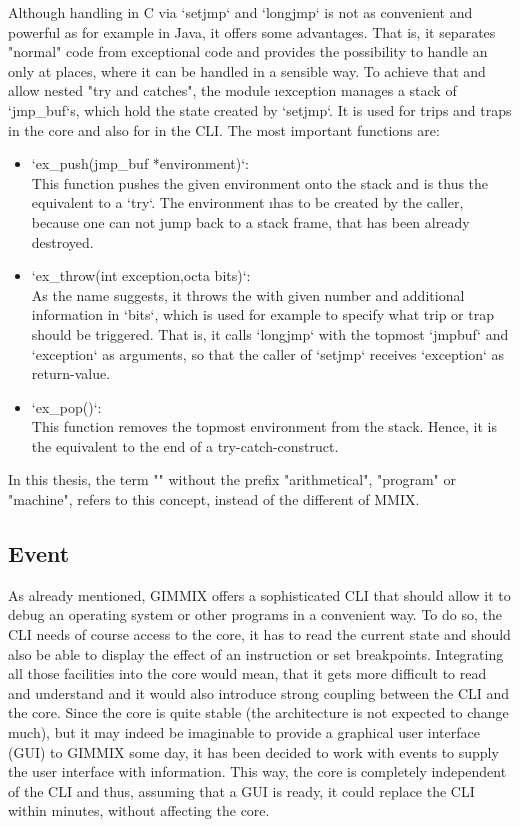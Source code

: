 Although  handling in C via `setjmp` and `longjmp` is not as convenient and powerful as for example in Java, it offers some advantages. That is, it separates "normal" code from exceptional code and provides the possibility to handle an  only at places, where it can be handled in a sensible way. To achieve that and allow nested "try and catches", the module \i{exception} manages a stack of `jmp_buf`s, which hold the state created by `setjmp`. It is used for trips and traps in the core and also for  in the CLI. The most important functions are:
\begin{itemize}
	\item `ex_push(jmp_buf *environment)`:\\
	This function pushes the given environment onto the stack and is thus the equivalent to a `try`. The environment \i{has to} be created by the caller, because one can not jump back to a stack frame, that has been already destroyed.
	\item `ex_throw(int exception,octa bits)`:\\
	As the name suggests, it throws the  with given number and additional information in `bits`, which is used for example to specify what trip or trap should be triggered. That is, it calls `longjmp` with the topmost `jmpbuf` and `exception` as arguments, so that the caller of `setjmp` receives `exception` as return-value.
	\item `ex_pop()`:\\
	This function removes the topmost environment from the stack. Hence, it is the equivalent to the end of a try-catch-construct.
\end{itemize}
In this thesis, the term "" without the prefix "arithmetical", "program" or "machine", refers to this concept, instead of the different  of MMIX.

\subsection{Event}

As already mentioned, GIMMIX offers a sophisticated CLI that should allow it to debug an operating system or other programs in a convenient way. To do so, the CLI needs of course access to the core, \ie it has to read the current state and should also be able to display the effect of an instruction or set breakpoints. Integrating all those facilities into the core would mean, that it gets more difficult to read and understand and it would also introduce strong coupling between the CLI and the core. Since the core is quite stable (the architecture is not expected to change much), but it may indeed be imaginable to provide a graphical user interface (GUI) to GIMMIX some day, it has been decided to work with events to supply the user interface with information. This way, the core is completely independent of the CLI and thus, assuming that a GUI is ready, it could replace the CLI within minutes, without affecting the core.

